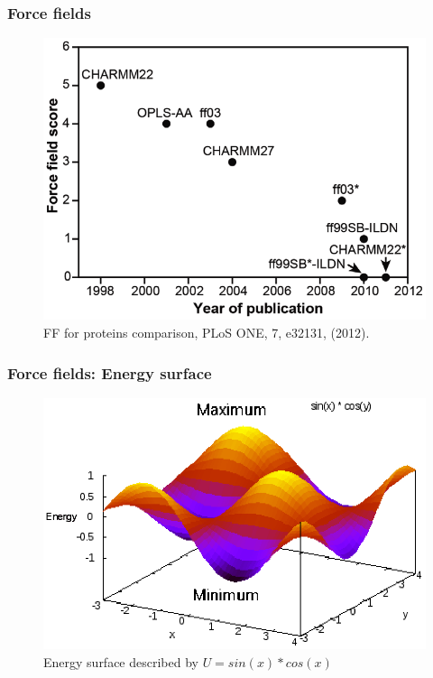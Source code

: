 \documentclass{beamer}
\begin{document}
\begin{frame}\frametitle{Force fields}

\begin{figure}
\includegraphics[scale=0.34]{ff_comparison.png}
\caption{{\scriptsize FF for proteins comparison, PLoS ONE, 7, e32131, (2012).}}
\end{figure}


\end{frame}

\begin{frame}\frametitle{Force fields: Energy surface}

\begin{figure}
\includegraphics[scale=0.681]{surface.eps}
\caption{{\scriptsize Energy surface described by $U=sin(x)*cos(x)$}}
\end{figure}

\end{frame}
\end{document}

